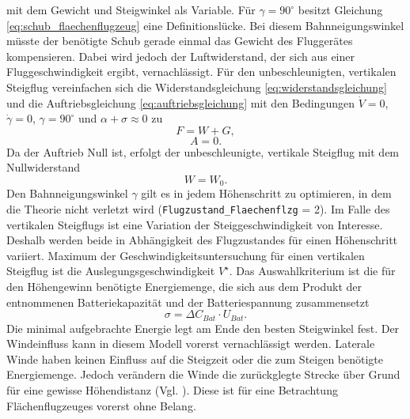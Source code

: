 mit dem Gewicht und Steigwinkel als Variable.
Für \ensuremath{\gamma = 90^\circ} besitzt Gleichung \ref{eq:schub_flaechenflugzeug} eine Definitionslücke. Bei diesem Bahnneigungswinkel müsste der benötigte Schub gerade einmal das Gewicht des Fluggerätes kompensieren. Dabei wird jedoch der Luftwiderstand, der sich aus einer Fluggeschwindigkeit ergibt, vernachlässigt. 
Für den unbeschleunigten, vertikalen Steigflug vereinfachen sich die Widerstandsgleichung \ref{eq:widerstandsgleichung} und die Auftriebsgleichung \ref{eq:auftriebsgleichung} mit den Bedingungen \ensuremath{\dot{V} = 0}, \ensuremath{\dot{\gamma} = 0}, \ensuremath{\gamma = 90^\circ} und \ensuremath{\alpha + \sigma \approx 0} zu 
\begin{equation}
	F = W + G , 
\end{equation}
\begin{equation}
	A = 0 .
\end{equation}
Da der Auftrieb Null ist, erfolgt der unbeschleunigte, vertikale Steigflug mit dem Nullwiderstand
\begin{equation}
	W = W_0 .
\end{equation}
Den Bahnneigungswinkel \ensuremath{\gamma} gilt es in jedem Höhenschritt zu optimieren, in dem die Theorie nicht verletzt wird (\texttt{Flugzustand\_Flaechenflzg} = 2). Im Falle des vertikalen Steigflugs ist eine Variation der Steiggeschwindigkeit von Interesse. Deshalb werden beide in Abhängigkeit des Flugzustandes für einen Höhenschritt variiert. Maximum der Geschwindigkeitsuntersuchung für einen vertikalen Steigflug ist die Auslegungsgeschwindigkeit \ensuremath{V^\star}. Das Auswahlkriterium ist die für den Höhengewinn benötigte Energiemenge, die sich aus dem Produkt der entnommenen Batteriekapazität und der Batteriespannung zusammensetzt
\begin{equation}
	\sigma = \Delta C_{Bat}\cdot U_{Bat}.
\end{equation}
Die minimal aufgebrachte Energie legt am Ende den besten Steigwinkel fest.
Der Windeinfluss kann in diesem Modell vorerst vernachlässigt werden. Laterale Winde haben keinen Einfluss auf die Steigzeit oder die zum Steigen benötigte Energiemenge. Jedoch verändern die Winde die zurückglegte Strecke über Grund für eine gewisse Höhendistanz (Vgl. \cite[S.241-242]{Scheiderer.2008}). Diese ist für eine Betrachtung Flächenflugzeuges vorerst ohne Belang. 



